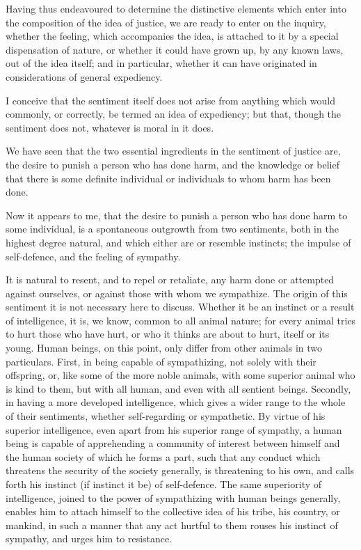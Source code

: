 \documentclass[12pt]{report}
\begin{document}
Having thus endeavoured to determine the distinctive elements which enter into the composition of the idea of justice, we are ready to enter on the inquiry, whether the feeling, which accompanies the idea, is attached to it by a special dispensation of nature, or whether it could have grown up, by any known laws, out of the idea itself; and in particular, whether it can have originated in considerations of general expediency.

I conceive that the sentiment itself does not arise from anything which would commonly, or correctly, be termed an idea of expediency; but that, though the sentiment does not, whatever is moral in it does.

We have seen that the two essential ingredients in the sentiment of justice are, the desire to punish a person who has done harm, and the knowledge or belief that there is some definite individual or individuals to whom harm has been done.

Now it appears to me, that the desire to punish a person who has done harm to some individual, is a spontaneous outgrowth from two sentiments, both in the highest degree natural, and which either are or resemble instincts; the impulse of self-defence, and the feeling of sympathy.

It is natural to resent, and to repel or retaliate, any harm done or attempted against ourselves, or against those with whom we sympathize. The origin of this sentiment it is not necessary here to discuss. Whether it be an instinct or a result of intelligence, it is, we know, common to all animal nature; for every animal tries to hurt those who have hurt, or who it thinks are about to hurt, itself or its young. Human beings, on this point, only differ from other animals in two particulars. First, in being capable of sympathizing, not solely with their offspring, or, like some of the more noble animals, with some superior animal who is kind to them, but with all human, and even with all sentient beings. Secondly, in having a more developed intelligence, which gives a wider range to the whole of their sentiments, whether self-regarding or sympathetic. By virtue of his superior intelligence, even apart from his superior range of sympathy, a human being is capable of apprehending a community of interest between himself and the human society of which he forms a part, such that any conduct which threatens the security of the society generally, is threatening to his own, and calls forth his instinct (if instinct it be) of self-defence. The same superiority of intelligence, joined to the power of sympathizing with human beings generally, enables him to attach himself to the collective idea of his tribe, his country, or mankind, in such a manner that any act hurtful to them rouses his instinct of sympathy, and urges him to resistance.
\end{document}
